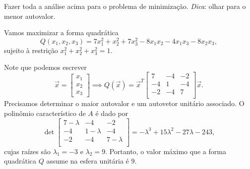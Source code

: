 \begin{exer}
	Fazer toda a análise acima para o problema de minimização. \textit{Dica}: olhar para o menor autovalor.
\end{exer}


\begin{ex}\label{otimiz}
	Vamos maximizar a forma quadrática
	\begin{equation}
	Q(x_1, x_2, x_3) = 7 x_1^2 + x_2^2 + 7x_3^2 - 8 x_1x_2 - 4x_1x_3 - 8 x_2x_3,
	\end{equation} sujeito à restrição $x_1^2 + x_2^2 + x_3^2 = 1$.

	Note que podemos escrever
	\begin{equation}
	\vec{x} =
	\begin{bmatrix}
	x_1 \\ x_2 \\ x_3
	\end{bmatrix} \implies
	Q(\vec{x}) = \vec{x}^T
	\begin{bmatrix}
	7 & -4 & -2 \\
	-4 &  1 & -4 \\
	-2 & -4 &  7 \\
	\end{bmatrix}\vec{x}.
	\end{equation} Precisamos determinar o maior autovalor e um autovetor unitário associado. O polinômio característico de $A$ é dado por
	\begin{equation}
	\det
	\begin{bmatrix}
	7 - \lambda & -4 & -2 \\
	-4 &  1 - \lambda & -4 \\
	-2 & -4 &  7 - \lambda \\
	\end{bmatrix} = - \lambda^3 + 15 \lambda^2 - 27 \lambda - 243,
	\end{equation} cujas raízes são $\lambda_1 = -3$ e $\lambda_2 = 9$. Portanto, o valor máximo que a forma quadrática $Q$ assume na esfera unitária é $9$.


\end{ex}
